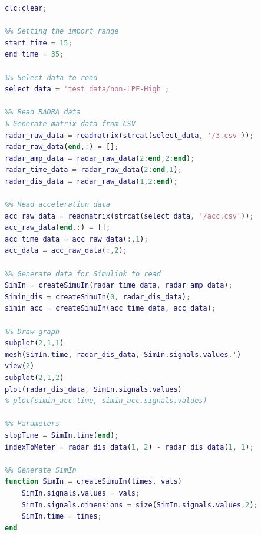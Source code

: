 \begin{lstlisting}[language=MATLAB]
clc;clear;

%% Setting the import range
start_time = 15;
end_time = 35;

%% Select data to read
select_data = 'test_data/non-LPF-High';

%% Read RADRA data
% Generate matrix data from CSV
radar_raw_data = readmatrix(strcat(select_data, '/3.csv'));
radar_raw_data(end,:) = [];
radar_amp_data = radar_raw_data(2:end,2:end);
radar_time_data = radar_raw_data(2:end,1);
radar_dis_data = radar_raw_data(1,2:end);

%% Read acceleration data
acc_raw_data = readmatrix(strcat(select_data, '/acc.csv'));
acc_raw_data(end,:) = [];
acc_time_data = acc_raw_data(:,1);
acc_data = acc_raw_data(:,2);

%% Generate data for Simulink to read
SimIn = createSimuIn(radar_time_data, radar_amp_data);
Simin_dis = createSimuIn(0, radar_dis_data);
simin_acc = createSimuIn(acc_time_data, acc_data);

%% Draw graph
subplot(2,1,1)
mesh(SimIn.time, radar_dis_data, SimIn.signals.values.')
view(2)
subplot(2,1,2)
plot(radar_dis_data, SimIn.signals.values)
% plot(simin_acc.time, simin_acc.signals.values)

%% Parameters
stopTime = SimIn.time(end);
indexToMeter = radar_dis_data(1, 2) - radar_dis_data(1, 1);

%% Generate SimIn
function SimIn = createSimuIn(times, vals)
    SimIn.signals.values = vals;
    SimIn.signals.dimensions = size(SimIn.signals.values,2);
    SimIn.time = times;
end
\end{lstlisting}

